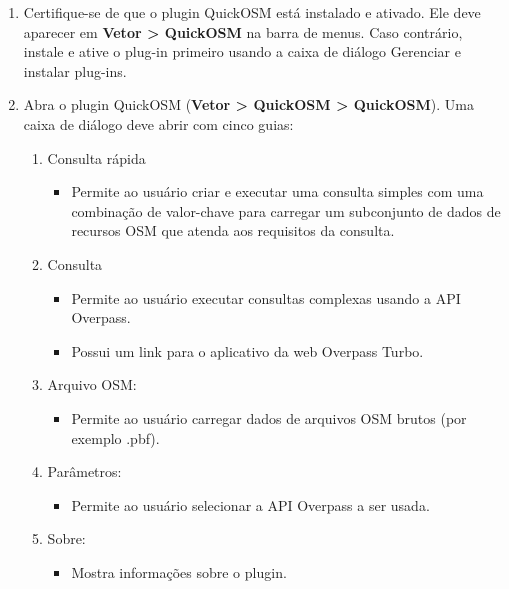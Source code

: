 \documentclass[
]{krantz}
\providecommand{\tightlist}{%
  \setlength{\itemsep}{0pt}\setlength{\parskip}{0pt}}
\begin{document}
\begin{enumerate}
\def\labelenumi{\arabic{enumi}.}
\setcounter{enumi}{1}
\item
  Certifique-se de que o plugin QuickOSM está instalado e ativado. Ele deve aparecer em \textbf{Vetor \textgreater{} QuickOSM} na barra de menus. Caso contrário, instale e ative o plug-in primeiro usando a caixa de diálogo Gerenciar e instalar plug-ins.
\item
  Abra o plugin QuickOSM (\textbf{Vetor \textgreater{} QuickOSM \textgreater{} QuickOSM}). Uma caixa de diálogo deve abrir com cinco guias:

  \begin{enumerate}
  \def\labelenumii{\arabic{enumii}.}
  \tightlist
  \item
    Consulta rápida

    \begin{itemize}
    \tightlist
    \item
      Permite ao usuário criar e executar uma consulta simples com uma combinação de valor-chave para carregar um subconjunto de dados de recursos OSM que atenda aos requisitos da consulta.
    \end{itemize}
  \item
    Consulta

    \begin{itemize}
    \tightlist
    \item
      Permite ao usuário executar consultas complexas usando a API Overpass.
    \item
      Possui um link para o aplicativo da web Overpass Turbo.
    \end{itemize}
  \item
    Arquivo OSM:

    \begin{itemize}
    \tightlist
    \item
      Permite ao usuário carregar dados de arquivos OSM brutos (por exemplo .pbf).
    \end{itemize}
  \item
    Parâmetros:

    \begin{itemize}
    \tightlist
    \item
      Permite ao usuário selecionar a API Overpass a ser usada.
    \end{itemize}
  \item
    Sobre:

    \begin{itemize}
    \tightlist
    \item
      Mostra informações sobre o plugin.
    \end{itemize}
  \end{enumerate}
\end{enumerate}
\end{document}
